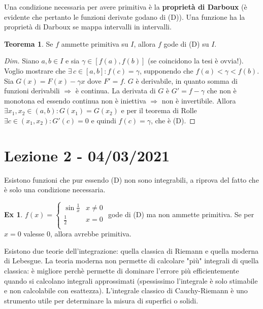 \documentclass{article}
\theoremstyle{definition}
\newtheorem{theorem}{Teorema}[section]
\theoremstyle{definition}
\theoremstyle{definition}
\theoremstyle{definition}
\theoremstyle{definition}
\newtheorem{example}{Ex}[section]
\theoremstyle{definition}
\begin{document}
Una condizione necessaria per avere primitiva è la \textbf{proprietà di Darboux} (è evidente che pertanto le funzioni derivate godano di (D)). Una funzione ha la proprietà di Darboux se mappa intervalli in intervalli.

\begin{theorem}
    Se $f$ ammette primitiva su $I$, allora $f$ gode di (D) su $I$.
    \begin{proof}[Dim]
        Siano $a,b \in I$ e sia $\gamma \in [f(a),f(b)]$ (se coincidono la tesi è ovvia!). Voglio mostrare che $\exists \, c \in [a,b]: f(c)=\gamma$, supponendo che $f(a)<\gamma < f(b)$. Sia $G(x)=F(x)-\gamma x$ dove $F'=f$. $G$ è derivabile, in quanto somma di funzioni derivabili $\Rightarrow$ è continua. La derivata di $G$ è $G'=f-\gamma$ che non è monotona ed essendo continua non è iniettiva $\Rightarrow$ non è invertibile. Allora $\exists x_1,x_2 \in (a,b): G(x_1) = G(x_2)$ e per il teorema di Rolle $\exists c \in (x_1,x_2): G'(c)=0$ e quindi $f(c) = \gamma$, che è (D).
    \end{proof}
\end{theorem}

\newpage
\section{Lezione 2 - 04/03/2021}

Esistono funzioni che pur essendo (D) non sono integrabili, a riprova del fatto che è solo una condizione necessaria.
\begin{example}
    $f(x) = \begin{cases}
        \sin \frac{1}{x} & \text{$x \neq 0$} \\
        \frac{1}{2} & \text{$x=0$} \\
    \end{cases}$
    gode di (D) ma non ammette primitiva. Se per $x=0$ valesse 0, allora avrebbe primitiva.
\end{example}

Esistono due teorie dell'integrazione: quella classica di Riemann e quella moderna di Lebesgue. La teoria moderna non permette di calcolare "più" integrali di quella classica: è migliore perchè permette di dominare l'errore più efficientemente quando si calcolano integrali approssimati (spessissimo l'integrale è solo stimabile e non calcolabile con esattezza). L'integrale classico di Cauchy-Riemann è uno strumento utile per determinare la misura di superfici o solidi.

\vspace{3mm}
\end{document}
